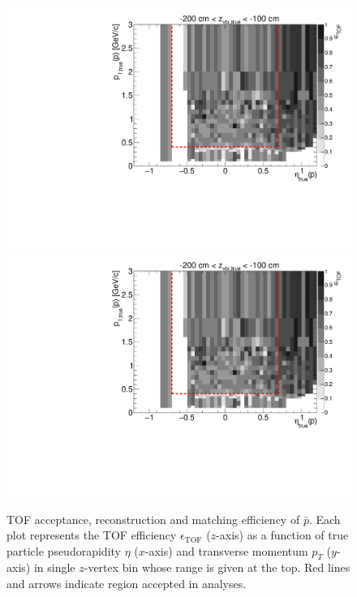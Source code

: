 \begin{figure}[hb]
\caption[TOF acceptance, reconstruction and matching efficiency of $\bar{p}$.]{TOF acceptance, reconstruction and matching efficiency of $\bar{p}$. Each plot represents the TOF efficiency $\epsilon_{\text{TOF}}$ ($z$-axis) as a function of true particle pseudorapidity $\eta$ ($x$-axis) and transverse momentum $p_{T}$ ($y$-axis) in single $z$-vertex bin whose range is given at the top. Red lines and arrows indicate region accepted in analyses.}\label{fig:eff_proton_minus}
\centering
\parbox{0.495\textwidth}{
  \centering
  \includegraphics[width=\linewidth,page=3]{graphics/eff/Eff2D_TOF_proton_Minus.pdf}\\
  \includegraphics[width=\linewidth,page=5]{graphics/eff/Eff2D_TOF_proton_Minus.pdf}\\
}
\end{figure}
